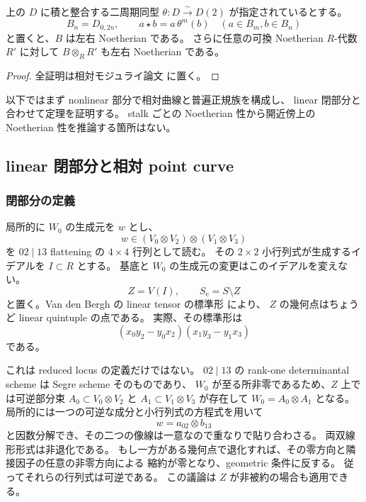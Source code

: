 \begin{corollary}[二周期の偶数環]
\label{cor:relative-periodic-even-noetherian}
上の $D$ に積と整合する二周期同型 $\theta:D\xrightarrow{\sim}D(2)$ が指定されているとする。
\begin{equation}\label{noeth-eq:even-ring}
 B_n=D_{0,2n},\qquad
 a\star b=a\,\theta^m(b)\quad(a\in B_m, b\in B_n)
\end{equation}
と置くと、$B$ は左右 Noetherian である。
さらに任意の可換 Noetherian $R$-代数 $R'$ に対して
$B\otimes_RR'$ も左右 Noetherian である。
\end{corollary}

\begin{proof}
全証明は相対モジュライ論文 \cite[\texttt{relative_cubic_noetherian}]{QuadricModuli2026} に置く。
\end{proof}

以下ではまず nonlinear 部分で相対曲線と普遍正規族を構成し、
linear 閉部分と合わせて定理を証明する。
stalk ごとの Noetherian 性から開近傍上の Noetherian 性を推論する箇所はない。

\subsection{linear 閉部分と相対 point curve}

\subsubsection{閉部分の定義}

局所的に $W_0$ の生成元を $w$ とし、
\[
 w\in (V_0\otimes V_2)\otimes(V_1\otimes V_3)
\]
を $02\mid13$ flattening の $4\times4$ 行列として読む。
その $2\times2$ 小行列式が生成するイデアルを $I\subset R$ とする。
基底と $W_0$ の生成元の変更はこのイデアルを変えない。
\[
 Z=V(I),\qquad S_{\mathrm e}=S\setminus Z
\]
と置く。Van den Bergh の linear tensor の標準形
\cite[Lemma 5.2.4, (5.3)]{VdB2011} により、
$Z$ の幾何点はちょうど linear quintuple の点である。
実際、その標準形は
\[
 (x_0y_2-y_0x_2)(x_1y_3-y_1x_3)
\]
である。

これは reduced locus の定義だけではない。
$02\mid13$ の rank-one determinantal scheme は Segre scheme そのものであり、
$W_0$ が至る所非零であるため、$Z$ 上では可逆部分束
$A_0\subset V_0\otimes V_2$ と $A_1\subset V_1\otimes V_3$ が存在して
$W_0=A_0\otimes A_1$ となる。
局所的には一つの可逆な成分と小行列式の方程式を用いて
\begin{equation}\label{noeth-eq:linear-factorization}
 w=a_{02}\otimes b_{13}
\end{equation}
と因数分解でき、その二つの像線は一意なので重なりで貼り合わさる。
両双線形形式は非退化である。
もし一方がある幾何点で退化すれば、その零方向と隣接因子の任意の非零方向による
縮約が零となり、geometric 条件に反する。
従ってそれらの行列式は可逆である。
この議論は $Z$ が非被約の場合も適用できる。

